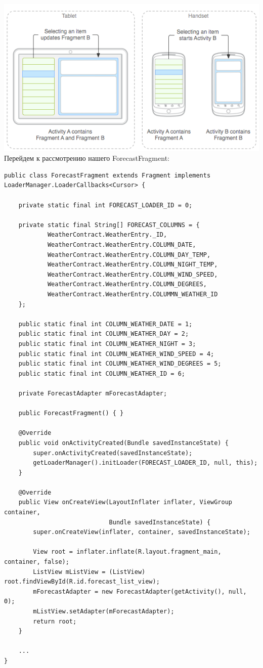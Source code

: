 \documentclass[12 pt]{article}
\begin{document}
\includegraphics{fragments.png}
Перейдем к рассмотрению нашего ForecastFragment:
	\begin{lstlisting}
public class ForecastFragment extends Fragment implements LoaderManager.LoaderCallbacks<Cursor> {

    private static final int FORECAST_LOADER_ID = 0;

    private static final String[] FORECAST_COLUMNS = {
            WeatherContract.WeatherEntry._ID,
            WeatherContract.WeatherEntry.COLUMN_DATE,
            WeatherContract.WeatherEntry.COLUMN_DAY_TEMP,
            WeatherContract.WeatherEntry.COLUMN_NIGHT_TEMP,
            WeatherContract.WeatherEntry.COLUMN_WIND_SPEED,
            WeatherContract.WeatherEntry.COLUMN_DEGREES,
            WeatherContract.WeatherEntry.COLUMMN_WEATHER_ID
    };

    public static final int COLUMN_WEATHER_DATE = 1;
    public static final int COLUMN_WEATHER_DAY = 2;
    public static final int COLUMN_WEATHER_NIGHT = 3;
    public static final int COLUMN_WEATHER_WIND_SPEED = 4;
    public static final int COLUMN_WEATHER_WIND_DEGREES = 5;
    public static final int COLUMN_WEATHER_ID = 6;

    private ForecastAdapter mForecastAdapter;

    public ForecastFragment() { }

    @Override
    public void onActivityCreated(Bundle savedInstanceState) {
        super.onActivityCreated(savedInstanceState);
        getLoaderManager().initLoader(FORECAST_LOADER_ID, null, this);
    }

    @Override
    public View onCreateView(LayoutInflater inflater, ViewGroup container,
                             Bundle savedInstanceState) {
        super.onCreateView(inflater, container, savedInstanceState);

        View root = inflater.inflate(R.layout.fragment_main, container, false);
        ListView mListView = (ListView) root.findViewById(R.id.forecast_list_view);
        mForecastAdapter = new ForecastAdapter(getActivity(), null, 0);
        mListView.setAdapter(mForecastAdapter);
        return root;
    }

    ...
}
    \end{lstlisting}
\end{document}

